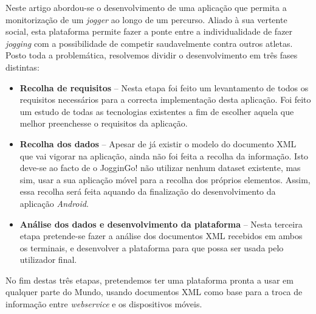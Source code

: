 \documentclass[twocolumn,twoside,10pt,a4paper]{article}
\begin{document}
Neste artigo abordou-se o desenvolvimento de uma aplicação que permita a monitorização de um \textit{jogger} ao longo de um percurso. Aliado à sua vertente social, esta plataforma permite fazer a ponte entre a individualidade de fazer \textit{jogging} com a possibilidade de competir saudavelmente contra outros atletas.
Posto toda a problemática, resolvemos dividir o desenvolvimento em três fases distintas:

\begin{itemize}
\item \textbf{Recolha de requisitos} -- Nesta etapa foi feito um levantamento de todos os requisitos necessários para a correcta implementação desta aplicação. Foi feito um estudo de todas as tecnologias existentes a fim de escolher aquela que melhor preenchesse o requisitos da aplicação.
\item \textbf{Recolha dos dados} -- Apesar de já existir o modelo do documento XML que vai vigorar na aplicação, ainda não foi feita a recolha da informação. Isto deve-se ao facto de o JogginGo! não utilizar nenhum dataset existente, mas sim, usar a sua aplicação móvel para a recolha dos próprios elementos. Assim, essa recolha será feita aquando da finalização do desenvolvimento  da aplicação \textit{Android}.
\item \textbf{Análise dos dados e desenvolvimento da plataforma}  -- Nesta terceira etapa pretende-se fazer a análise dos documentos XML recebidos em ambos os terminais, e desenvolver a plataforma para que possa ser usada pelo utilizador final.
\end{itemize}

No fim destas três etapas, pretendemos ter uma plataforma pronta a usar em qualquer parte do Mundo, usando documentos XML como base para a troca de informação entre 	\textit{webservice} e os dispositivos móveis.


\nocite{*}
\renewcommand{\bibname}{Referências}
%
%

%
{}
\end{document}
